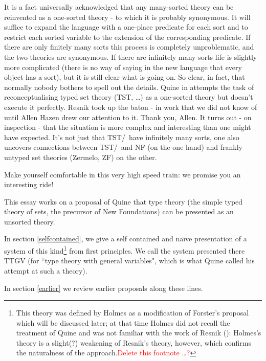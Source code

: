 \documentclass[12pt]{article}
\begin{document}
It is a fact universally acknowledged that any many-sorted theory can
be reinvented as a one-sorted theory - to which it is probably
synonymous.  It will suffice to expand the language with a one-place
predicate for each sort and to restrict each sorted variable to the
extension of the corresponding predicate.  If there are only finitely
many sorts this process is completely unproblematic, and the two
theories are synonymous.  If there are infinitely many sorts life is
slightly more complicated (there is no way of saying in the new
language that every object has a sort), but it is still clear what is
going on.  So clear, in fact, that normally nobody bothers to spell
out the details. Quine in \cite{ST&iL} attempts the task of
reconceptualising typed set theory (TST, \TZT \ldots) as a one-sorted
theory but doesn't execute it perfectly.  Resnik \cite{resnikttgv}
took up the baton - in work that we did not know of until Allen Hazen
drew our attention to it. Thank you, Allen.  It turns out - on
inspection - that the situation is more complex and interesting than
one might have expected. It's not just that TST/\TZT\ have infinitely
many sorts, one also uncovers connections between TST/\TZT\ and NF (on
the one hand) and frankly untyped set theories (Zermelo, ZF) on the
other.

Make yourself comfortable in this very high speed train: we promise you an interesting ride!

\bigskip

This essay works on a proposal of Quine \cite{ST&iL} that type theory
(the simple typed theory of sets, the precursor of New Foundations)
can be presented as an unsorted theory.

In section \ref{selfcontained}, we give a self contained and
na\"{\i}ve presentation of a system of this kind\footnote{This theory
was defined by Holmes as a modification of Forster's proposal which
will be discussed later; at that time Holmes did not recall the
treatment of Quine \cite{ST&iL} and was not familiar with the work of
Resnik (\cite{resnikttgv}): Holmes's theory is a slight(?) weakening
of Resnik's theory, however, which confirms the naturalness of the
approach.\textcolor{red}{Delete this footnote \ldots?}} from first principles.  We call the system presented there
TTGV (for ``type theory with general variables", which is what Quine
called his attempt at such a theory).

In section \ref{earlier} we review earlier proposals along these lines.

\newpage
\end{document}
